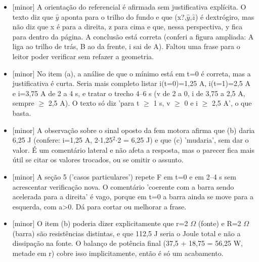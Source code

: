 \documentclass{article}%
\begin{document}
\begin{itemize}%
\item%
{[}minor{]} A orientação do referencial é afirmada sem justificativa explícita. O texto diz que $\hat y$ aponta para o trilho do fundo e que (x?,$\hat y$,$\hat z$) é dextrógiro, mas não diz que x é para a direita, z para cima e que, nessa perspectiva, y fica para dentro da página. A conclusão está correta (conferi a figura ampliada: A liga ao trilho de trás, B ao da frente, i sai de A). Faltou uma frase para o leitor poder verificar sem refazer a geometria.%
\item%
{[}minor{]} No item (a), a análise de que o mínimo está em t=0 é correta, mas a justificativa é curta. Seria mais completo listar i(t=0)=1,25 A, i(t=1)=2,5 A e i=3,75 A de 2 a 4 s, e tratar o trecho 4--6 s (v de 2 a 0, i de 3,75 a 2,5 A, sempre $\geq$ 2,5 A). O texto só diz 'para t $\geq$ 1 s, v $\geq$ 0 e i $\geq$ 2,5 A', o que basta.%
\item%
{[}minor{]} A observação sobre o sinal oposto da fem motora afirma que (b) daria 6,25 J (confere: i=1,25 A, 2$\cdot$1,25$^2$$\cdot$2 = 6,25 J) e que (c) 'mudaria', sem dar o valor. É um comentário lateral e não afeta a resposta, mas o parecer fica mais útil se citar os valores trocados, ou se omitir o assunto.%
\item%
{[}minor{]} A seção 5 ('casos particulares') repete F em t=0 e em 2--4 s sem acrescentar verificação nova. O comentário 'coerente com a barra sendo acelerada para a direita' é vago, porque em t=0 a barra ainda se move para a esquerda, com a>0. Dá para cortar ou melhorar a frase.%
\item%
{[}minor{]} O item (b) poderia dizer explicitamente que r=2 $\Omega$ (fonte) e R=2 $\Omega$ (barra) são resistências distintas, e que 112,5 J seria o Joule total e não a dissipação na fonte. O balanço de potência final (37,5 + 18,75 = 56,25 W, metade em r) cobre isso implicitamente, então é só um acabamento.%
\end{itemize}%
\end{document}
